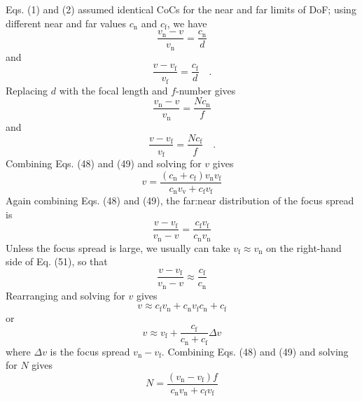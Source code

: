 \documentclass[11pt, oneside]{scrartcl}   	%
\newcommand{\Dv}{\ensuremath{\Delta v}}
\begin{document}
Eqs. (1) and (2) assumed identical CoCs for the near and far limits of DoF; using different near and far values $c_\mathrm{n}$ and $c_\mathrm{f}$, we have
\begin{equation}
   \frac{v_\mathrm{n} - v}{v_\mathrm{n}} = \frac{c_\mathrm{n}}d
   \label{eq:46}
\end{equation}
and
\begin{equation}
   \frac{v - v_\mathrm{f}}{v_\mathrm{f}} = \frac{c_\mathrm{f}}d \quad .
   \label{eq:47}
\end{equation}
Replacing $d$ with the focal length and $f$-number gives
\begin{equation}
   \frac{v_\mathrm{n} - v}{v_\mathrm{n}} = \frac{N\!c_\mathrm{n}}f
   \label{eq:48}
\end{equation}
and
\begin{equation}
   \frac{v - v_\mathrm{f}}{v_\mathrm{f}} = \frac{N\!c_\mathrm{f}}f \quad .
   \label{eq:49}
\end{equation}
Combining Eqs. (48) and (49) and solving for $v$ gives
\begin{equation}
v = \frac{(c_\mathrm{n} + c_\mathrm{f}) v_\mathrm{n} v_\mathrm{f}}{c_\mathrm{n}v_\mathrm{v} + c_\mathrm{f}v_\mathrm{f}}
   \label{eq:50}
\end{equation}
Again combining Eqs. (48) and (49), the far:near distribution of the focus spread is
\begin{equation}
   \frac{v - v_\mathrm{f}}{v_\mathrm{n} - v} = \frac{c_\mathrm{f}v_\mathrm{f}}{c_\mathrm{n}v_\mathrm{n}}
   \label{eq:51}
\end{equation}
Unless the focus spread is large, we usually can take $v_\mathrm{f} \approx v_\mathrm{n}$ on the right-hand side of
 Eq. (51), so that
\begin{equation}
   \frac{v - v_\mathrm{f}}{v_\mathrm{n} - v} \approx \frac{c_\mathrm{f}}{c_\mathrm{n}}
   \label{eq:52}
\end{equation}
Rearranging and solving for $v$ gives
\begin{equation}
   v\approx{c_\mathrm{f}v_\mathrm{n}+c_\mathrm{n}v_\mathrm{f}}{c_\mathrm{n}+c_\mathrm{f}}
   \label{eq:53}
\end{equation}
or
\begin{equation}
   v\approx v_\mathrm{f}+\frac{c_\mathrm{f}}{c_\mathrm{n}+c_\mathrm{f}}\Dv
   \label{eq:54}
\end{equation}
where $Δv$ is the focus spread $v_\mathrm{n} - v_\mathrm{f}$. Combining Eqs. (48) and (49) and solving for $N$ gives
\begin{equation}
   N=\frac{(v_\mathrm{n}-v_\mathrm{f})f}{c_\mathrm{n}v_\mathrm{n}+c_\mathrm{f}v_\mathrm{f}}
   \label{eq:55}
\end{equation}
\end{document}
